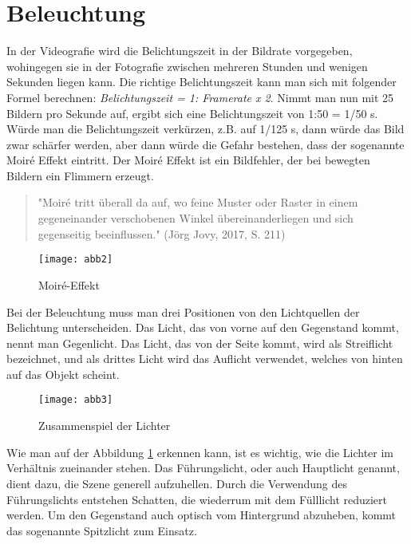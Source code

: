 \section{Beleuchtung}
In der Videografie wird die Belichtungszeit in der Bildrate vorgegeben, wohingegen sie in der Fotografie zwischen mehreren Stunden und wenigen Sekunden liegen kann.
Die richtige Belichtungszeit kann man sich mit folgender Formel berechnen: \textit{Belichtungszeit = 1: Framerate x 2}. Nimmt man nun mit 25 Bildern pro Sekunde auf, ergibt sich eine Belichtungszeit von 1:50 = 1/50 s. Würde man die Belichtungszeit verkürzen, z.B. auf 1/125 s, dann würde das Bild zwar schärfer werden, aber dann würde die Gefahr bestehen, dass der sogenannte Moir\'{e} Effekt eintritt. Der Moir\'{e} Effekt ist ein Bildfehler, der bei bewegten Bildern ein Flimmern erzeugt. \begin{quote}"Moir\'{e} tritt überall da auf, wo feine Muster oder Raster in einem gegeneinander verschobenen Winkel übereinanderliegen und sich gegenseitig beeinflussen." (Jörg Jovy, 2017, S. 211)\end{quote}
\begin{figure}[H]
	\centering
	\texttt{[image: abb2]} 
	\caption[Moir\'{e}-Effekt]{Moir\'{e}-Effekt\footnotemark}
\end{figure}
Bei der Beleuchtung muss man drei Positionen von den Lichtquellen der Belichtung unterscheiden. Das Licht, das von vorne auf den Gegenstand kommt, nennt man Gegenlicht. Das Licht, das von der Seite kommt, wird als Streiflicht bezeichnet, und als drittes Licht wird das Auflicht verwendet, welches von hinten auf das Objekt scheint.\citep{beleuchtung}
\begin{figure}[H]
	\centering
	\texttt{[image: abb3]}
	\caption[Zusammenspiel der Lichter]{Zusammenspiel der Lichter\footnotemark}\label{fig:abb3}
\end{figure}
Wie man auf der Abbildung \ref{fig:abb3} erkennen kann, ist es wichtig, wie die Lichter im Verhältnis zueinander stehen. Das Führungslicht, oder auch Hauptlicht genannt, dient dazu, die Szene generell aufzuhellen. Durch die Verwendung des Führungslichts entstehen Schatten, die wiederrum mit dem Fülllicht reduziert werden. Um den Gegenstand auch optisch vom Hintergrund abzuheben, kommt das sogenannte Spitzlicht zum Einsatz. \citep{lichter}
